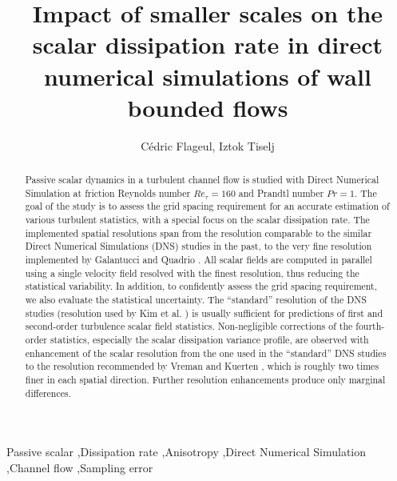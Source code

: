 \documentclass[review]{elsarticle}
\newcommand{\gqcite}{Galantucci and Quadrio \cite{galantucci2010very}}
\begin{document}
\begin{frontmatter}

\title{Impact of smaller scales on the scalar dissipation rate in direct numerical simulations of wall bounded flows}

\author{C\'edric Flageul, Iztok Tiselj}
\address{Reactor Engineering Division, Institut Jo\v{z}ef Stefan, Ljubljana, Slovenia}

\begin{abstract}
Passive scalar dynamics in a turbulent channel flow is studied with Direct Numerical Simulation at friction Reynolds number $Re_\tau=160$ and Prandtl number $Pr=1$. The goal of the study is to assess the grid spacing requirement for an accurate estimation of various turbulent statistics, with a special focus on the scalar dissipation rate. The implemented spatial resolutions span from the resolution comparable to the similar Direct Numerical Simulations (DNS) studies in the past, to the very fine resolution implemented by \gqcite. All scalar fields are computed in parallel using a single velocity field resolved with the finest resolution, thus reducing the statistical variability. In addition, to confidently assess the grid spacing requirement, we also evaluate the statistical uncertainty. The ``standard'' resolution of the DNS studies (resolution used by Kim et al. \cite{kim1987turbulence}) is usually sufficient for predictions of first and second-order turbulence scalar field statistics. Non-negligible corrections of the fourth-order statistics, especially the scalar dissipation variance profile, are observed with enhancement of the scalar resolution from the one used in  the ``standard'' DNS studies to the resolution recommended by Vreman and Kuerten \cite{vreman2014comparison}, which is roughly two times finer in each spatial direction. Further resolution enhancements produce only marginal differences.
\end{abstract}

\begin{keyword}
Passive scalar \sep Dissipation rate \sep Anisotropy \sep Direct Numerical Simulation \sep Channel flow \sep Sampling error
\end{keyword}

\end{frontmatter}

\linenumbers
\end{document}
